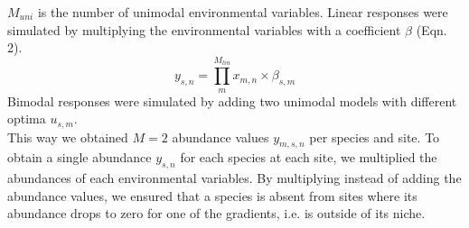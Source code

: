 \documentclass[a4paper,11pt]{article}
\begin{document}
		$M_{uni}$ is the number of unimodal environmental variables. 
		Linear responses were simulated by multiplying the environmental variables with a coefficient $\beta$ (Eqn. 2).
		\begin{equation}
		 				y_{s,n} = \prod_{m}^{M_{lin}} x_{m,n} \times \beta_{s,m}
		\end{equation}
		Bimodal responses were simulated by adding two unimodal models with different optima $u_{s,m}$.\\
		This way we obtained $M = 2$ abundance values $y_{m,s,n}$ per species and site. 
		To obtain a single abundance $y_{s,n}$ for each species at each site, we multiplied the abundances of each environmental variables.
		By multiplying instead of adding the abundance values, we ensured that a species is absent from sites where its abundance drops to zero for one of the gradients, i.e. is outside of its niche. 

		
\end{document}
